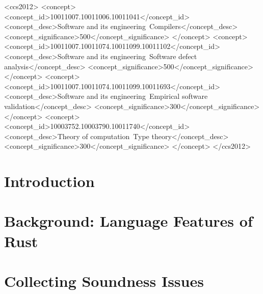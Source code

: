 \documentclass[acmsmall]{acmart}   %
\begin{document}
\begin{CCSXML}
<ccs2012>
<concept>
<concept_id>10011007.10011006.10011041</concept_id>
<concept_desc>Software and its engineering~Compilers</concept_desc>
<concept_significance>500</concept_significance>
</concept>
<concept>
<concept_id>10011007.10011074.10011099.10011102</concept_id>
<concept_desc>Software and its engineering~Software defect analysis</concept_desc>
<concept_significance>500</concept_significance>
</concept>
<concept>
<concept_id>10011007.10011074.10011099.10011693</concept_id>
<concept_desc>Software and its engineering~Empirical software validation</concept_desc>
<concept_significance>300</concept_significance>
</concept>
<concept>
<concept_id>10003752.10003790.10011740</concept_id>
<concept_desc>Theory of computation~Type theory</concept_desc>
<concept_significance>300</concept_significance>
</concept>
</ccs2012>
\end{CCSXML}



\maketitle

\section{Introduction}
\label{sec:intro}


\section{Background: Language Features of Rust}
\label{sec:background}


\section{Collecting Soundness Issues}
\label{sec:method}

\end{document}
